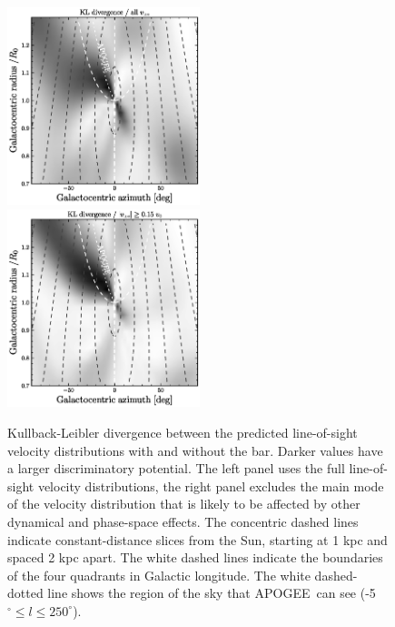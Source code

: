 \documentclass[12pt,preprint]{aastex}
\newcommand{\apogee}{APOGEE}
\begin{document}
\clearpage
\begin{figure}
\includegraphics[width=0.5\textwidth]{detecta.ps}
\includegraphics[width=0.5\textwidth]{detectb.ps}
\caption{Kullback-Leibler divergence between the predicted
  line-of-sight velocity distributions with and without the
  bar. Darker values have a larger discriminatory potential. The left
  panel uses the full line-of-sight velocity distributions, the right
  panel excludes the main mode of the velocity distribution that is
  likely to be affected by other dynamical and phase-space
  effects. The concentric dashed lines indicate
  constant-distance slices from the Sun, starting at 1 kpc and spaced
  2 kpc apart.  The white dashed lines indicate the boundaries of the
  four quadrants in Galactic longitude.  The white dashed-dotted line
  shows the region of the sky that \apogee\ can see (-5$^{\circ} \leq
  l \leq 250^{\circ}$).}\label{fig:detect}
\end{figure}
\end{document}
